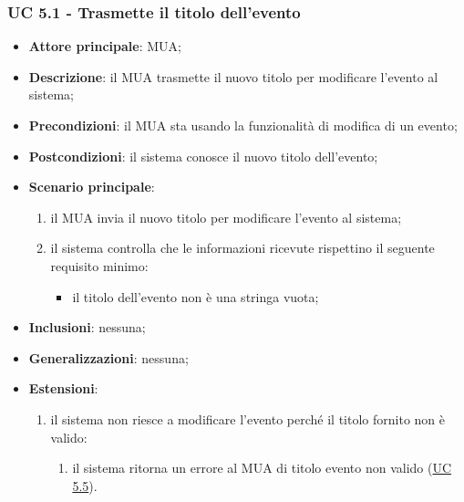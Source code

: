 \subsubsection{UC 5.1 - Trasmette il titolo dell'evento} \label{sec:UC5.1}
    \begin{itemize}
        \item \textbf{Attore principale}: MUA;
        \item \textbf{Descrizione}: il MUA trasmette il nuovo titolo per modificare l'evento al sistema;
        \item \textbf{Precondizioni}: il MUA sta usando la funzionalità di modifica di un evento;
        \item \textbf{Postcondizioni}: il sistema conosce il nuovo titolo dell'evento;
        \item \textbf{Scenario principale}:
            \begin{enumerate}
                \item il MUA invia il nuovo titolo per modificare l'evento al sistema;
                \item il sistema controlla che le informazioni ricevute rispettino il seguente requisito minimo:
                    \begin{itemize}
                        \item il titolo dell'evento non è una stringa vuota;
                    \end{itemize}
            \end{enumerate}
        \item \textbf{Inclusioni}: nessuna;
        \item \textbf{Generalizzazioni}: nessuna;
        \item \textbf{Estensioni}:
            \begin{enumerate}[label=\alph*.]
                \item il sistema non riesce a modificare l'evento perché il titolo fornito non è valido:
                \begin{enumerate}[label=\arabic*.]
                    \item il sistema ritorna un errore al MUA di titolo evento non valido (\hyperref[sec:UC5.5]{UC 5.5}).
                \end{enumerate}
            \end{enumerate}
    \end{itemize}



